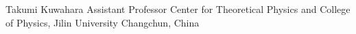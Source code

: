 \makecvheader
  {Takumi Kuwahara}
  {Assistant Professor}
  {Center for Theoretical Physics and College of Physics, Jilin University}
  {
    Changchun, China
    \cvsep
    \cvsep
    \cvsep
  }
